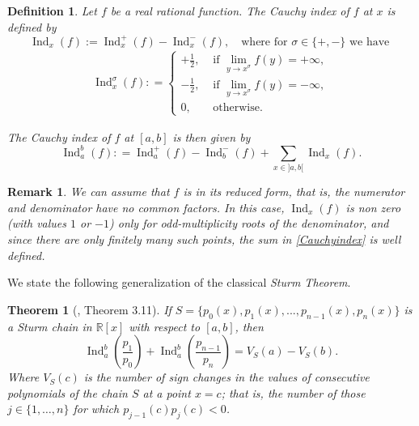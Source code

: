 \documentclass[sn-basic]{sn-jnl}%
\theoremstyle{thmstyleone}%
\newtheorem{theorem}{Theorem}%
\theoremstyle{thmstyletwo}%
\newtheorem{remark}{Remark}%
\theoremstyle{thmstylethree}%
\newtheorem{definition}{Definition}%
\DeclareMathOperator{\Ind}{Ind}
\begin{document}
\begin{appendices}
\begin{definition}
    Let $f  $ be a real rational function. The Cauchy index of $f$ at $x$ is defined by 
$$
        \Ind_x(f) := \Ind_x^+(f) - \Ind_x^-(f), \quad \text{where for } \sigma \in \{+,-\} \text{ we have }
 $$
 \begin{align*}
        \Ind_x^{\sigma}(f): = \begin{cases}
            +\frac{1}{2}, & \text{ if } \displaystyle \lim_{y \to x^{\sigma}}f(y) = +\infty, \\
            -\frac{1}{2}, & \text{ if } \displaystyle  \lim_{y \to x^{\sigma}}f(y) = -\infty, \\
            0, & \text{ otherwise.} 
        \end{cases}
    \end{align*}
 
    The Cauchy index of $f$ at $[a,b]$ is then given by   
    \begin{equation}\label{Cauchyindex}
        \Ind_a^b(f) : = \Ind_a^+(f) - \Ind_b^-(f) + \sum_{x \in ]a,b[ } \Ind_x(f).
    \end{equation}

\end{definition}

\begin{remark}
    We can assume that $f$ is in its reduced form, that is, the numerator and denominator have no common factors.  In this case, $\Ind_x(f)$ is non zero (with values $1$ or $-1$) only for odd-multiplicity roots of the denominator, and since there are only finitely many such points, the sum in \ref{Cauchyindex} is well defined.
\end{remark}

We state the following generalization of the classical \textit{Sturm Theorem}.

\begin{theorem}[\cite{Eiser08}, Theorem 3.11]\label{Sturm}
    If $S = \{p_0(x),p_1(x),...,p_{n-1}(x),p_n(x)\}$ is a Sturm chain in $\mathbb{R}[x]$ with respect to $[a,b]$, then
    \begin{equation}\label{Sturmequality}
    \Ind_a^b\left(\frac{p_1}{p_0}\right) +  \Ind_a^b\left(\frac{p_{n-1}}{p_n}\right) = V_S(a) - V_S(b) .
    \end{equation}
    Where $V_S(c)$ is the number of sign changes in the values of consecutive polynomials of the chain $S$ at a point $x=c$; that is, the number of those $j \in \{1, \ldots, n \}$ for which $p_{j-1}(c) p_j(c) < 0$.
\end{theorem}


\end{appendices}
\end{document}
